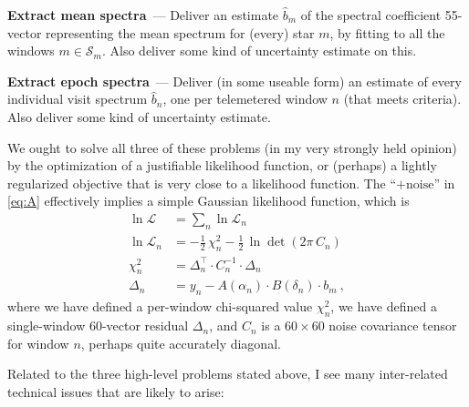 \documentclass[11pt]{article}
\renewcommand{\paragraph}[1]{\medskip\par\noindent\textbf{#1}~---}
\begin{document}
\paragraph{Extract mean spectra}
Deliver an estimate $\hat{b}_m$ of the spectral coefficient 55-vector representing the mean spectrum for (every) star $m$, by fitting to all the windows $m\in\mathscr{S}_m$. Also deliver some kind of uncertainty estimate on this.

\paragraph{Extract epoch spectra}
Deliver (in some useable form) an estimate of every individual visit spectrum $\hat{b}_n$, one per telemetered window $n$ (that meets criteria). Also deliver some kind of uncertainty estimate.

\medskip

We ought to solve all three of these problems (in my very strongly held opinion) by the optimization of a justifiable likelihood function, or (perhaps) a lightly regularized objective that is very close to a likelihood function.
The ``$+\mbox{noise}$'' in \eqref{eq:A} effectively implies a simple Gaussian likelihood function, which is
\begin{align}
    \ln\mathscr{L} &= \sum_n \ln\mathscr{L}_n \label{eq:lf1}\\
    \ln\mathscr{L}_n &= -\frac{1}{2}\,\chi^2_n - \frac{1}{2}\,\ln\det(2\pi\,C_n)\\
    \chi^2_n &= \Delta_n^\top\cdot C_n^{-1}\cdot \Delta_n \\
    \Delta_n &= y_n - A(\alpha_n)\cdot B(\delta_n)\cdot b_m ~,\label{eq:lf2}
\end{align}
where we have defined a per-window chi-squared value $\chi^2_n$,
we have defined a single-window 60-vector residual $\Delta_n$,
and $C_n$ is a $60\times 60$ noise covariance tensor for window $n$, perhaps quite accurately diagonal.

Related to the three high-level problems stated above, I see many inter-related technical issues that are likely to arise:
\end{document}
